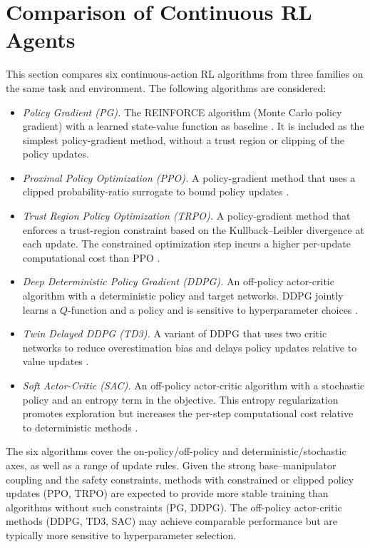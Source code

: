 \documentclass{ieeeaccess}
\begin{document}
\section{Comparison of Continuous RL Agents} \label{comparison}
This section compares six continuous-action RL algorithms from three families on the same task
and environment. The following algorithms are considered:

\begin{itemize}
  \item \textit{Policy Gradient (PG).} The REINFORCE algorithm (Monte Carlo policy gradient) with a
  learned state-value function as baseline \cite{b7,b21}. It is included as the simplest
  policy-gradient method, without a trust region or clipping of the policy updates.
  \item \textit{Proximal Policy Optimization (PPO).} A policy-gradient method that uses a clipped
probability-ratio surrogate to bound policy updates \cite{b15}.
  \item \textit{Trust Region Policy Optimization (TRPO).} A policy-gradient method that enforces a trust-region
constraint based on the Kullback--Leibler divergence at each update. The constrained optimization step incurs
a higher per-update computational cost than PPO \cite{b14}.
  \item \textit{Deep Deterministic Policy Gradient (DDPG).} An off-policy actor-critic algorithm with a
deterministic policy and target networks. DDPG jointly learns a $Q$-function and a policy and
is sensitive to hyperparameter choices \cite{b16}.
  \item \textit{Twin Delayed DDPG (TD3).} A variant of DDPG that uses two critic networks
  to reduce overestimation bias and delays policy updates relative to value updates \cite{b17}.
  \item \textit{Soft Actor-Critic (SAC).} An off-policy actor-critic algorithm with a stochastic policy and an
  entropy term in the objective. This entropy regularization promotes exploration but increases the per-step
  computational cost relative to deterministic methods \cite{b18}.
\end{itemize}

The six algorithms cover the on-policy/off-policy and deterministic/stochastic axes, as well as a range
of update rules. Given the strong base--manipulator coupling and the safety constraints, methods with
constrained or clipped policy updates (PPO, TRPO) are expected to provide more stable training
than algorithms without such constraints (PG, DDPG). The off-policy actor-critic methods (DDPG, TD3, SAC)
may achieve comparable performance but are typically more sensitive to hyperparameter selection.
\end{document}
